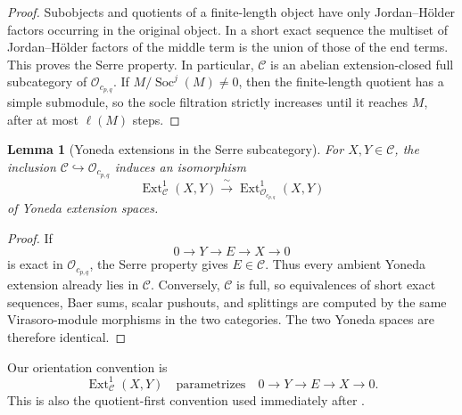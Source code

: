 \documentclass[12pt,leqno]{amsart}
\numberwithin{equation}{section}
\newtheorem{lem}[thm]{Lemma}
\newcommand{\Ext}{\operatorname{Ext}}
\newcommand{\Soc}{\operatorname{Soc}}
\newcommand{\Oc}{\mathcal O}
\begin{document}
\begin{proof}
Subobjects and quotients of a finite-length object have only
Jordan--H\"older factors occurring in the original object.  In a short
exact sequence the multiset of Jordan--H\"older factors of the middle term
is the union of those of the end terms.  This proves the Serre property.  In particular, $\mathscr C$ is an
abelian extension-closed full subcategory of $\Oc_{c_{p,q}}$.
If $M/\Soc^j(M)\ne0$, then the finite-length quotient has a simple
submodule, so the socle filtration strictly increases until it reaches
$M$, after at most $\ell(M)$ steps.
\end{proof}

\begin{lem}[Yoneda extensions in the Serre subcategory]
\label{lem:Nakano-exact-compatibility}
For $X,Y\in\mathscr C$, the inclusion
$\mathscr C\hookrightarrow\Oc_{c_{p,q}}$ induces an isomorphism
\[
 \Ext^1_{\mathscr C}(X,Y)
 \xrightarrow{\ \sim\ }
 \Ext^1_{\Oc_{c_{p,q}}}(X,Y)
\]
of Yoneda extension spaces.
\end{lem}

\begin{proof}
If
\[
 0\longrightarrow Y\longrightarrow E\longrightarrow X\longrightarrow0
\]
is exact in $\Oc_{c_{p,q}}$, the Serre property gives $E\in\mathscr C$.
Thus every ambient Yoneda extension already lies in $\mathscr C$.
Conversely, $\mathscr C$ is full, so equivalences of short exact sequences,
Baer sums, scalar pushouts, and splittings are computed by the same
Virasoro-module morphisms in the two categories.  The two Yoneda spaces
are therefore identical.
\end{proof}

Our orientation convention is
\begin{equation}\label{eq:Ext-convention}
 \Ext^1_{\mathscr C}(X,Y)
 \quad\text{parametrizes}\quad
 0\longrightarrow Y\longrightarrow E\longrightarrow X\longrightarrow0.
\end{equation}
This is also the quotient-first convention used immediately after
\cite[Definition~5.1]{Nakano}.
\end{document}
